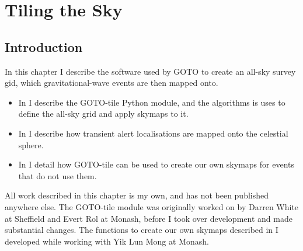 \chapter{Tiling the Sky}
\label{chap:tiling}
\chaptoc{}


\newpage
\section{Introduction}
\label{sec:tiling_intro}
\begin{colsection}

In this chapter I describe the software used by GOTO to create an all-sky survey gid, which gravitational-wave events are then mapped onto. 
%
\begin{itemize}
    \item In  I describe the GOTO-tile Python module, and the algorithms is uses to define the all-sky grid and apply skymaps to it.
    \item In  I describe how transient alert localisations are mapped onto the celestial sphere.
    \item In  I detail how GOTO-tile can be used to create our own skymaps for events that do not use them.
\end{itemize}
%
All work described in this chapter is my own, and has not been published anywhere else. The GOTO-tile module was originally worked on by Darren White at Sheffield and Evert Rol at Monash, before I took over development and made substantial changes. The functions to create our own skymaps described in  I developed while working with Yik Lun Mong at Monash.

\end{colsection}


\newpage
